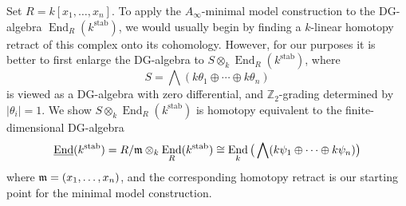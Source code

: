 \documentclass[english,letter paper,12pt,leqno]{article}
\theoremstyle{example}
\numberwithin{equation}{section}
\def\stab{\operatorname{stab}}
\def\be{\begin{equation}}
\def\ee{\end{equation}}
\def\nZ{\mathds{Z}}
\DeclareMathOperator{\End}{End}
\begin{document}
Set $R =  k[x_1,\ldots,x_n]$. To apply the $A_\infty$-minimal model construction to the DG-algebra $\End_R(k^{\stab})$, we would usually begin by finding a $k$-linear homotopy retract of this complex onto its cohomology. However, for our purposes it is better to first enlarge the DG-algebra to $S \otimes_k \End_R(k^{\stab})$, where
\be
S = \bigwedge( k\theta_1 \oplus \cdots \oplus k \theta_n )
\ee
is viewed as a DG-algebra with zero differential, and $\nZ_2$-grading determined by $|\theta_i| = 1$. We show $S \otimes_k \End_R(k^{\stab})$ is homotopy equivalent to the finite-dimensional DG-algebra
\[
\underline{\End}(k^{\stab}) = R/\mf{m} \otimes_k \End_R(k^{\stab}) \cong \End_k\big( \bigwedge( k\psi_1 \oplus \cdots \oplus k \psi_n) \big)
\]
where $\mathfrak{m} = (x_1,\ldots,x_n)$, and the corresponding homotopy retract is our starting point for the minimal model construction.
\end{document}
